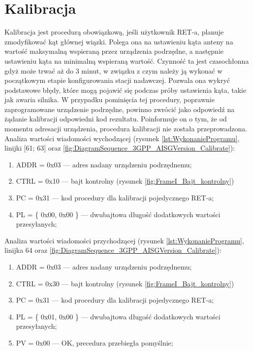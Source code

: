 \section{Kalibracja}
Kalibracja jest procedurą obowiązkową, jeśli użytkownik RET-a, planuje zmodyfikować kąt głównej wiązki. 
Polega ona na ustawieniu kąta anteny na wartość maksymalną
wspieraną przez urządzenia podrzędne, a następnie ustawieniu kąta na minimalną wspieraną wartość. 
Czynność ta jest czasochłonna gdyż może trwać aż do 3 minut, w związku z czym należy ją wykonać w początkowym
etapie konfigurowania stacji nadawczej. Pozwala ona wykryć podstawowe błędy, które mogą pojawić się podczas próby
ustawienia kąta, takie jak awaria silnika. W przypadku pominięcia tej procedury, poprawnie zaprogramowane urządzenie
podrzędne, powinno zwrócić jako odpowiedź na żądanie kalibracji odpowiedni kod rezultatu. Poinformuje on o tym, że
od momentu adresacji urządzenia, procedura kalibracji nie została przeprowadzona.
\newline\newline
Analiza wartości wiadomości wychodzącej 
(rysunek \ref{lst:WykonanieProgramu}, linijki [61; 63] oraz \ref{fig:DiagramSequence_3GPP_AISGVersion_Calibrate}):
\begin{enumerate}
    \item ADDR = 0x03 --- adres nadany urządzeniu podrzędnemu;
    \item CTRL = 0x10 --- bajt kontrolny (rysunek \ref{fig:FrameI_Bajt_kontrolny})
    \item PC = 0x31 --- kod procedury dla kalibracji pojedycznego RET-a;
    \item PL = \{ 0x00, 0x00 \} --- dwubajtowa długość dodatkowych wartości przesyłanych;
\end{enumerate}
\bigskip
Analiza wartości wiadomości przychodzącej 
(rysunek \ref{lst:WykonanieProgramu}, linijka 64 oraz \ref{fig:DiagramSequence_3GPP_AISGVersion_Calibrate}):
\begin{enumerate}
    \item ADDR = 0x03 --- adres nadany urządzeniu podrzędnemu;
    \item CTRL = 0x30 --- bajt kontrolny (rysunek \ref{fig:FrameI_Bajt_kontrolny})
    \item PC = 0x31 --- kod procedury dla kalibracji pojedycznego RET-a;
    \item PL = \{ 0x01, 0x00 \} --- dwubajtowa długość dodatkowych wartości przesyłanych;
    \item PV = 0x00 --- OK, precedura przebiegła pomyślnie;
\end{enumerate}